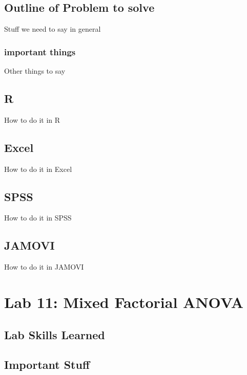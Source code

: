 \documentclass[]{book}
\theoremstyle{definition}
\theoremstyle{definition}
\theoremstyle{definition}
\theoremstyle{remark}
\begin{document}
\section{Outline of Problem to
solve}\label{outline-of-problem-to-solve-4}

Stuff we need to say in general

\subsection{important things}\label{important-things-4}

Other things to say

\section{R}\label{r-10}

How to do it in R

\section{Excel}\label{excel-9}

How to do it in Excel

\section{SPSS}\label{spss-9}

How to do it in SPSS

\section{JAMOVI}\label{jamovi-9}

How to do it in JAMOVI

\chapter{Lab 11: Mixed Factorial
ANOVA}\label{lab-11-mixed-factorial-anova}

\section{Lab Skills Learned}\label{lab-skills-learned-5}

\section{Important Stuff}\label{important-stuff-5}
\end{document}
